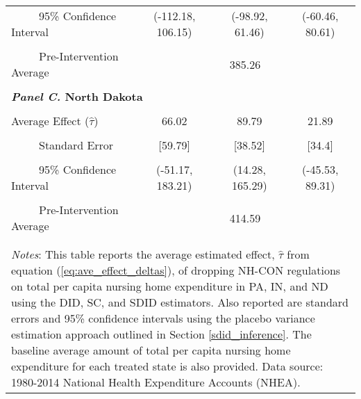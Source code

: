 \documentclass[../Main.tex]{subfiles}
\begin{document}
\begin{table}[htbp]
\begin{tabular}{l*{3}{c}}
\multicolumn{1}{l}{\ \ \ \ \ 95\% Confidence Interval}&   \multicolumn{1}{c}{(-112.18, 106.15)}&   \multicolumn{1}{c}{(-98.92, 61.46)}&   \multicolumn{1}{c}{(-60.46, 80.61)}\\
\\[-2ex]
\multicolumn{1}{l}{\ \ \ \ \ Pre-Intervention Average}&   \multicolumn{3}{c}{385.26}\\
\\[-.1ex]
\multicolumn{4}{l}{\textbf{\textit{Panel C.} North Dakota}}\\
\\[-1.5ex]
\multicolumn{1}{l}{Average Effect ($\hat{\tau}$)}&   \multicolumn{1}{c}{66.02}&   \multicolumn{1}{c}{89.79}&  \multicolumn{1}{c}{21.89}\\
\\[-2ex]
\multicolumn{1}{l}{\ \ \ \ \ Standard Error}  &\multicolumn{1}{c}{[59.79]}&\multicolumn{1}{c}{[38.52]}&\multicolumn{1}{c}{[34.4]}\\
\\[-2ex]
\multicolumn{1}{l}{\ \ \ \ \ 95\% Confidence Interval}&   \multicolumn{1}{c}{(-51.17, 183.21)}&   \multicolumn{1}{c}{(14.28, 165.29)}&   \multicolumn{1}{c}{(-45.53, 89.31)}\\
\\[-2ex]
\multicolumn{1}{l}{\ \ \ \ \ Pre-Intervention Average}&   \multicolumn{3}{c}{414.59}\\
\\[-.1ex]
\hline\hline
\\[-2ex]
\multicolumn{4}{p{.78\linewidth}}{\footnotesize \textit{Notes}: This table reports the average estimated effect, $\hat{\tau}$ from equation (\ref{eq:ave_effect_deltas}), of dropping NH-CON regulations on total per capita nursing home expenditure in PA, IN, and ND using the DID, SC, and SDID estimators. Also reported are standard errors and 95\% confidence intervals using the placebo variance estimation approach outlined in Section \ref{sdid_inference}. The baseline average amount of total per capita nursing home expenditure for each treated state is also provided. Data source: 1980-2014 National Health Expenditure Accounts (NHEA).}
\end{tabular}
\end{table}
\vfill
\clearpage
\end{document}
